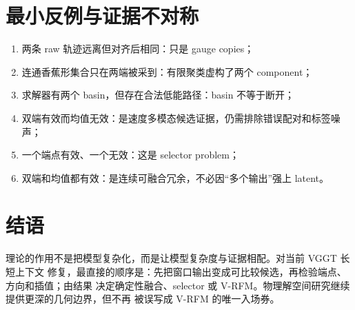 \documentclass[UTF8,a4paper,11pt]{ctexart}
\begin{document}
\section{最小反例与证据不对称}

\begin{enumerate}
  \item 两条 raw 轨迹远离但对齐后相同：只是 gauge copies；
  \item 连通香蕉形集合只在两端被采到：有限聚类虚构了两个 component；
  \item 求解器有两个 basin，但存在合法低能路径：basin 不等于断开；
  \item 双端有效而均值无效：是速度多模态候选证据，仍需排除错误配对和标签噪声；
  \item 一个端点有效、一个无效：这是 selector problem；
  \item 双端和均值都有效：是连续可融合冗余，不必因“多个输出”强上 latent。
\end{enumerate}

\section*{结语}

理论的作用不是把模型复杂化，而是让模型复杂度与证据相配。对当前 VGGT 长短上下文
修复，最直接的顺序是：先把窗口输出变成可比较候选，再检验端点、方向和插值；由结果
决定确定性融合、selector 或 V-RFM。物理解空间研究继续提供更深的几何边界，但不再
被误写成 V-RFM 的唯一入场券。



\end{document}
